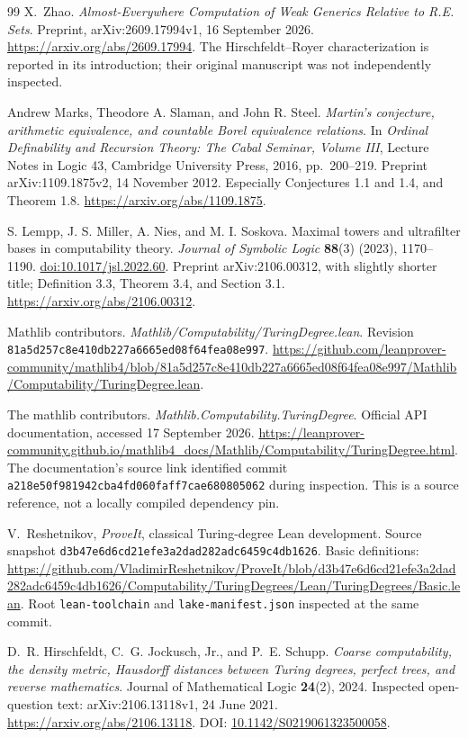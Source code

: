 \documentclass[11pt,a4paper]{article}
\theoremstyle{definition}\newtheorem{definition}[theorem]{Definition}
\theoremstyle{remark}\newtheorem{remark}[theorem]{Remark}
\begin{document}
\begin{thebibliography}{99}
X.~Zhao.
\emph{Almost-Everywhere Computation of Weak Generics Relative to R.E. Sets}.
Preprint, arXiv:2609.17994v1, 16 September 2026.
\url{https://arxiv.org/abs/2609.17994}.
The Hirschfeldt--Royer characterization is reported in its introduction; their original manuscript was not independently inspected.

Andrew Marks, Theodore A. Slaman, and John R. Steel.
\emph{Martin's conjecture, arithmetic equivalence, and countable Borel equivalence relations}.
In \emph{Ordinal Definability and Recursion Theory: The Cabal Seminar, Volume III},
Lecture Notes in Logic 43, Cambridge University Press, 2016, pp.\ 200--219.
Preprint arXiv:1109.1875v2, 14 November 2012.
Especially Conjectures 1.1 and 1.4, and Theorem 1.8.
\url{https://arxiv.org/abs/1109.1875}.

S. Lempp, J. S. Miller, A. Nies, and M. I. Soskova.
Maximal towers and ultrafilter bases in computability theory.
\emph{Journal of Symbolic Logic} \textbf{88}(3) (2023), 1170--1190.
\href{https://doi.org/10.1017/jsl.2022.60}{doi:10.1017/jsl.2022.60}.
Preprint arXiv:2106.00312, with slightly shorter title;
Definition 3.3, Theorem 3.4, and Section 3.1.
\url{https://arxiv.org/abs/2106.00312}.

Mathlib contributors.
\emph{Mathlib/Computability/TuringDegree.lean}.
Revision \texttt{81a5d257c8e410db227a6665ed08f64fea08e997}.
\url{https://github.com/leanprover-community/mathlib4/blob/81a5d257c8e410db227a6665ed08f64fea08e997/Mathlib/Computability/TuringDegree.lean}.

The mathlib contributors.
\emph{Mathlib.Computability.TuringDegree}. Official API documentation,
accessed 17 September 2026.
\url{https://leanprover-community.github.io/mathlib4_docs/Mathlib/Computability/TuringDegree.html}.
The documentation's source link identified commit
\texttt{a218e50f981942cba4fd060faff7cae680805062} during inspection.
This is a source reference, not a locally compiled dependency pin.

V.~Reshetnikov, \emph{ProveIt}, classical Turing-degree Lean development.
Source snapshot \texttt{d3b47e6d6cd21efe3a2dad282adc6459c4db1626}.
Basic definitions:
\url{https://github.com/VladimirReshetnikov/ProveIt/blob/d3b47e6d6cd21efe3a2dad282adc6459c4db1626/Computability/TuringDegrees/Lean/TuringDegrees/Basic.lean}.
Root \texttt{lean-toolchain} and \texttt{lake-manifest.json} inspected at the same commit.

D.~R. Hirschfeldt, C.~G. Jockusch, Jr., and P.~E. Schupp.
\emph{Coarse computability, the density metric, Hausdorff distances between Turing degrees, perfect trees, and reverse mathematics}.
Journal of Mathematical Logic \textbf{24}(2), 2024.
Inspected open-question text: arXiv:2106.13118v1, 24 June 2021.
\url{https://arxiv.org/abs/2106.13118}.
DOI: \href{https://doi.org/10.1142/S0219061323500058}{10.1142/S0219061323500058}.


\end{thebibliography}
\end{document}
